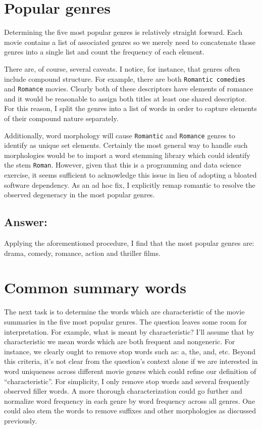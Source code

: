 \documentclass[aps,prc,reprint,amsmath]{revtex4-1}
\newcommand{\txt}[1]{\texttt{#1}}
\begin{document}
\section{Popular genres}

Determining the five most popular genres is relatively straight forward. Each movie contains a list of associated genres so we merely need to concatenate those genres into a single list and count the frequency of each element.

There are, of course, several caveats. I notice, for instance, that genres often include compound structure. For example, there are both \txt{Romantic comedies} and \txt{Romance} movies. Clearly both of these descriptors have elements of romance and it would be reasonable to assign both titles at least one shared descriptor. For this reason, I split the genres into a list of words in order to capture elements of their compound nature separately.

Additionally, word morphology will cause \txt{Romantic} and \txt{Romance} genres to identify as unique set elements. Certainly the most general way to handle such morphologies would be to import a word stemming library which could identify the stem \txt{Roman}. However, given that this is a programming and data science exercise, it seems sufficient to acknowledge this issue in lieu of adopting a bloated software dependency. As an ad hoc fix, I explicitly remap romantic to resolve the observed degeneracy in the most popular genres. 

\subsection*{Answer:}
Applying the aforementioned procedure, I find that the most popular genres are: drama, comedy, romance, action and thriller films.

\section{Common summary words}

The next task is to determine the words which are characteristic of the movie summaries in the five most popular genres.
The question leaves some room for interpretation. For example, what is meant by characteristic?
I'll assume that by characteristic we mean words which are both frequent and nongeneric.
For instance, we clearly ought to remove stop words such as: a, the, and, etc.
Beyond this criteria, it's not clear from the question's context alone if we are interested in word uniqueness across different movie genres which could refine our definition of ``characteristic''. For simplicity, I only remove stop words and several frequently observed filler words. A more thorough characterization could go further and normalize word frequency in each genre by word frequency across all genres. One could also stem the words to remove suffixes and other morphologies as discussed previously. 
\end{document}
